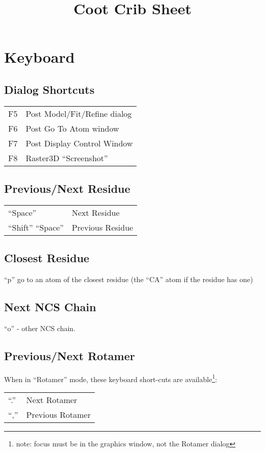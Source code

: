 \documentclass[twocolumn]{article}
\title{Coot Crib Sheet}
\begin{document}
\maketitle

\section{Keyboard}

\subsection{Dialog Shortcuts}
\begin{tabular}{ll}
  F5  & Post Model/Fit/Refine dialog \\
  F6  & Post Go To Atom window \\
  F7  & Post Display Control Window\\
  F8 & Raster3D ``Screenshot''
\end{tabular}


\subsection{Previous/Next Residue}

\begin{tabular}{ll}
  ``Space'' & Next Residue \\
  ``Shift'' ``Space'' & Previous Residue
\end{tabular}

\subsection{Closest Residue}
``p'' go to an atom of the closest residue (the ``CA'' atom if the
residue has one)

\subsection{Next NCS Chain}
``o'' - other NCS chain.

\subsection{Previous/Next Rotamer}

When in ``Rotamer'' mode, these keyboard short-cuts are
available\footnote{note: focus must be in the graphics window, not
  the Rotamer dialog}:

\begin{tabular}{ll}
  ``.'' & Next Rotamer \\
  ``,'' & Previous Rotamer
\end{tabular}
\end{document}
